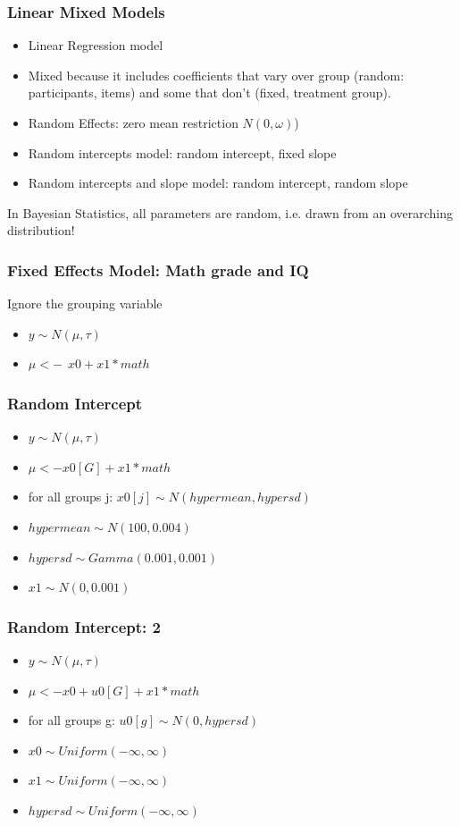 \documentclass[hyperref={pdfpagelabels=false},unknownkeysallowed]{beamer}
\begin{document}
\begin{frame}
\frametitle{Linear Mixed Models}

\begin{itemize}
\item Linear Regression model
\item Mixed because it includes coefficients that vary over group (random: participants, items) and some that don't (fixed, treatment group). 
\item Random Effects: zero mean restriction $N(0,\omega)$)
\item Random intercepts model: random intercept, fixed slope
\item Random intercepts and slope model: random intercept, random slope
\end{itemize} 
\centering In Bayesian Statistics, all parameters are random, i.e. drawn from an overarching distribution!  
\note{}
\end{frame}


\begin{frame}
\frametitle{Fixed Effects Model: Math grade and IQ}
Ignore the grouping variable
\begin{itemize}
\item $y \sim N(\mu,\tau)$
\item $\mu <- ~~x0 + x1 * math$
\end{itemize} 
\note{}
\end{frame}

\begin{frame}
\frametitle{Random Intercept}
\begin{itemize}
\item $y \sim N(\mu,\tau)$
\item $\mu <- x0[G] + x1 * math$
\item for all groups j: $x0[j] \sim N(hypermean,hypersd)$
\item $hypermean \sim N(100,0.004)$
\item $hypersd \sim Gamma(0.001,0.001)$
\item $x1 \sim N(0,0.001)$
\end{itemize} 
\note{}
\end{frame}

\begin{frame}
\frametitle{Random Intercept: 2}
\begin{itemize}
\item $y \sim N(\mu,\tau)$
\item $\mu <- x0+ u0[G] + x1 * math$
\item for all groups g: $u0[g] \sim N(0,hypersd)$
\item $x0 \sim Uniform(-\infty,\infty)$
\item $x1 \sim Uniform(-\infty,\infty)$
\item $hypersd \sim Uniform(-\infty,\infty)$
\end{itemize} 
\note{}
\end{frame}
\end{document}
